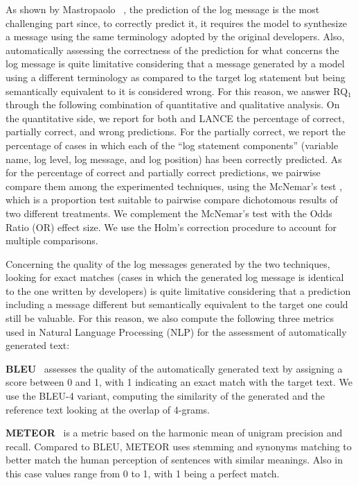 As shown by Mastropaolo \etal~\cite{mastropaolo2022using}, the prediction of the log message is the most challenging part since, to correctly predict it, it requires the model to synthesize a message using the same terminology adopted by the original developers. Also, automatically assessing the correctness of the prediction for what concerns the log message is quite limitative considering that a message generated by a model using a different terminology as compared to the target log statement but being semantically equivalent to it is considered wrong. For this reason, we answer RQ$_1$ through the following combination of quantitative and qualitative analysis. On the quantitative side, we report for both \approach and LANCE the percentage of correct, partially correct, and wrong predictions. For the partially correct, we report the percentage of cases in which each of the ``log statement components'' (\ie variable name, log level, log message, and log position) has been correctly predicted. As for the percentage of correct and partially correct predictions, we pairwise compare them among the experimented techniques, using the McNemar's test \cite{mcnemar}, which is a proportion test suitable to pairwise compare dichotomous results of two different treatments. We complement the McNemar's test with the Odds Ratio (OR) effect size. We use the Holm's correction procedure \cite{Holm1979a} to account for multiple comparisons.

Concerning the quality of the log messages generated by the two techniques, looking for exact matches (\ie cases in which the generated log message is identical to the one written by developers) is quite limitative considering that a prediction including a message different but semantically equivalent to the target one could still be valuable. For this reason, we also compute the following three metrics used in Natural Language Processing (NLP) for the assessment of automatically generated text:

\textbf{BLEU}~\cite{papineni2002bleu} assesses the quality of the automatically generated text by assigning a score between 0 and 1, with 1 indicating an exact match with the target text. We use the BLEU-4 variant, computing the similarity of the generated and the reference text looking at the overlap of 4-grams.

\textbf{METEOR}~\cite{meteor} is a metric based on the harmonic mean of unigram precision and recall. Compared to BLEU, METEOR uses stemming and synonyms matching to better match the human perception of sentences with similar meanings. Also in this case values range from 0 to 1, with 1 being a perfect match.

